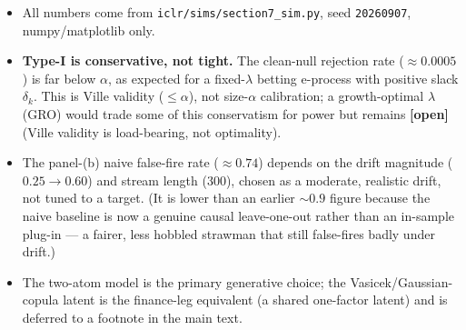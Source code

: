 \documentclass[11pt,a4paper]{article}
\begin{document}
\begin{itemize}
  \item All numbers come from \texttt{iclr/sims/section7\_sim.py}, seed
        \texttt{20260907}, numpy/matplotlib only.
  \item \textbf{Type-I is conservative, not tight.} The clean-null rejection
        rate ($\approx 0.0005$) is far below $\alpha$, as expected for a
        fixed-$\lambda$ betting e-process with positive slack $\delta_k$. This
        is Ville validity ($\le\alpha$), not size-$\alpha$ calibration; a
        growth-optimal $\lambda$ (GRO) would trade some of this conservatism for
        power but remains \textbf{[open]} (Ville validity is load-bearing, not
        optimality).
  \item The panel-(b) naive false-fire rate ($\approx 0.74$) depends on the
        drift magnitude ($0.25\to0.60$) and stream length ($300$), chosen as a
        moderate, realistic drift, not tuned to a target. (It is lower than an
        earlier $\sim 0.9$ figure because the naive baseline is now a genuine
        causal leave-one-out rather than an in-sample plug-in --- a fairer,
        less hobbled strawman that still false-fires badly under drift.)
  \item The two-atom model is the primary generative choice; the
        Vasicek/Gaussian-copula latent is the finance-leg equivalent (a shared
        one-factor latent) and is deferred to a footnote in the main text.
\end{itemize}
\end{document}
